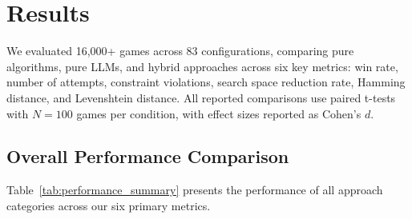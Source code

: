 \section{Results}
\label{sec:results}

We evaluated 16,000+ games across 83 configurations, comparing pure algorithms, pure LLMs, and hybrid approaches across six key metrics: win rate, number of attempts, constraint violations, search space reduction rate, Hamming distance, and Levenshtein distance. All reported comparisons use paired t-tests with $N=100$ games per condition, with effect sizes reported as Cohen's $d$.

\subsection{Overall Performance Comparison}

Table~\ref{tab:performance_summary} presents the performance of all approach categories across our six primary metrics.

